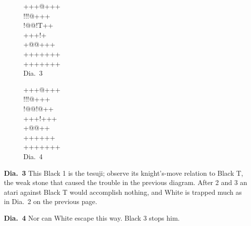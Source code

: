 \documentclass[mcrownvopaper,10pt,twopage,onecolumn,final]{memoir}
\begin{document}
\begin{figure}[ht]
    \begin{minipage}[c]{0.5\linewidth}
        \centering    
        {\gnos%
        +++@+++\\
        !!!@+++\\
        !@@!T++\\
        +++!{\gnosw{}}{\gnosb{}}+\\
        +@@++{\gnosb{}}+\\
        +++++++\\
        +++++++\\
        }
        Dia.\ 3
    \end{minipage}%
    \begin{minipage}[c]{0.5\linewidth}
        \centering    
        {\gnos%
        +++@+++\\
        !!!@+++\\
        !@@!@++\\
        +++!+++\\
        +@@+{\gnosw{}}{\gnosb{}}+\\
        ++++{\gnosb{}}++\\
        +++++++\\
        }
        Dia.\ 4
    \end{minipage}
\end{figure}

\noindent
\textbf{Dia.\ 3} This Black 1 is the tesuji; observe its knight's-move relation to
Black {\gnos T}, the weak stone that caused the trouble in the previous
diagram. After 2 and 3 an atari against Black {\gnos T} would accomplish
nothing, and White is trapped much as in Dia.\ 2 on the previous page. 

\noindent
\textbf{Dia.\ 4} Nor can White escape this way. Black 3 stops him.
\end{document}
